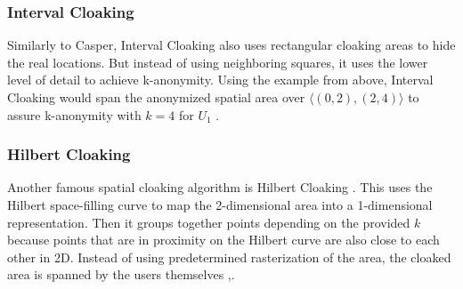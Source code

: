 \subsubsection{Interval Cloaking}
Similarly to Casper, Interval Cloaking also uses rectangular cloaking areas to hide the real locations. But instead of using neighboring squares, it uses the lower level of detail to achieve k-anonymity. Using the example from above, Interval Cloaking would span the anonymized spatial area over \(\langle(0,2),(2,4)\rangle\) to assure k-anonymity with \(k=4\) for \(U_1\) \cite{DBLP:conf/ssd/TanLM09}\cite{DBLP:conf/pet/ChengZBP06}.

\subsubsection{Hilbert Cloaking}
Another famous spatial cloaking algorithm is Hilbert Cloaking \cite{DBLP:conf/socialcom/UmKC10}. This uses the Hilbert space-filling curve to map the 2-dimensional area into a 1-dimensional representation. Then it groups together points depending on the provided \(k\) because points that are in proximity on the Hilbert curve are also close to each other in 2D. Instead of using predetermined rasterization of the area, the cloaked area is spanned by the users themselves \cite{DBLP:journals/is/GhinitaZPK10}\cite{DBLP:journals/sigkdd/Gkoulalas-DivanisKV10},\cite{DBLP:conf/ssd/TanLM09}.
